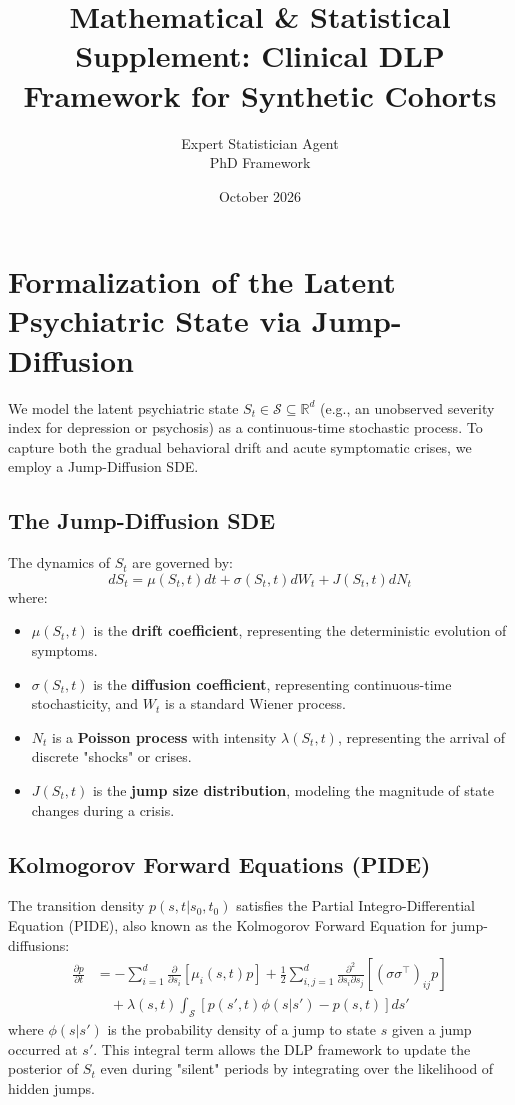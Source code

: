 \documentclass{article}
\title{Mathematical \& Statistical Supplement: Clinical DLP Framework for Synthetic Cohorts}
\author{Expert Statistician Agent \\ PhD Framework}
\date{October 2026}
\begin{document}
\maketitle

\section{Formalization of the Latent Psychiatric State via Jump-Diffusion}

We model the latent psychiatric state $S_t \in \mathcal{S} \subseteq \mathbb{R}^d$ (e.g., an unobserved severity index for depression or psychosis) as a continuous-time stochastic process. To capture both the gradual behavioral drift and acute symptomatic crises, we employ a Jump-Diffusion SDE.

\subsection{The Jump-Diffusion SDE}
The dynamics of $S_t$ are governed by:
\begin{equation}
    dS_t = \mu(S_t, t) dt + \sigma(S_t, t) dW_t + J(S_t, t) dN_t
\end{equation}
where:
\begin{itemize}
    \item $\mu(S_t, t)$ is the \textbf{drift coefficient}, representing the deterministic evolution of symptoms.
    \item $\sigma(S_t, t)$ is the \textbf{diffusion coefficient}, representing continuous-time stochasticity, and $W_t$ is a standard Wiener process.
    \item $N_t$ is a \textbf{Poisson process} with intensity $\lambda(S_t, t)$, representing the arrival of discrete "shocks" or crises.
    \item $J(S_t, t)$ is the \textbf{jump size distribution}, modeling the magnitude of state changes during a crisis.
\end{itemize}

\subsection{Kolmogorov Forward Equations (PIDE)}
The transition density $p(s, t | s_0, t_0)$ satisfies the Partial Integro-Differential Equation (PIDE), also known as the Kolmogorov Forward Equation for jump-diffusions:
\begin{align}
    \frac{\partial p}{\partial t} &= -\sum_{i=1}^d \frac{\partial}{\partial s_i} [\mu_i(s, t) p] + \frac{1}{2} \sum_{i,j=1}^d \frac{\partial^2}{\partial s_i \partial s_j} [(\sigma \sigma^\top)_{ij} p] \nonumber \\
    &\quad + \lambda(s, t) \int_{\mathcal{S}} [p(s', t) \phi(s | s') - p(s, t)] ds'
\end{align}
where $\phi(s | s')$ is the probability density of a jump to state $s$ given a jump occurred at $s'$. This integral term allows the DLP framework to update the posterior of $S_t$ even during "silent" periods by integrating over the likelihood of hidden jumps.
\end{document}
